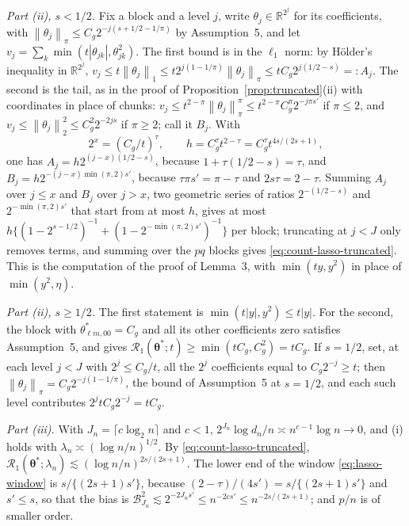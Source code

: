 \documentclass[10pt]{book}
\theoremstyle{definition}
\newcommand{\R}{\mathbb{R}}
\newcommand{\norm}[1]{\left\lVert #1 \right\rVert}
\newcommand{\cv}{\ell}
\newcommand{\md}{m}
\newcommand{\lev}{j}
\newcommand{\tsl}{k}
\newcommand{\btheta}{\boldsymbol{\theta}}
\newcommand{\thetastar}{\btheta^{*}}
\newcommand{\penn}{\lambda_{n}}
\newcommand{\seff}{s'}
\newcommand{\Rone}{\mathcal{R}_{1}}
\begin{document}
{\emph{Part (ii), $s < 1/2$.} Fix a block and a level $\lev$, write
$\theta_{\lev} \in \R^{2^{\lev}}$ for its coefficients, with
$\norm{\theta_{\lev}}_{\pi} \le C_g2^{-\lev(s+1/2-1/\pi)}$ by Assumption~5,
and let $v_{\lev} = \sum_{\tsl}\min(t|\theta_{\lev\tsl}|,\theta_{\lev\tsl}^{2})$.
The first bound is in the $\ell_1$ norm: by H\"older's inequality in
$\R^{2^{\lev}}$, $v_{\lev} \le t\norm{\theta_{\lev}}_{1} \le
t2^{\lev(1-1/\pi)}\norm{\theta_{\lev}}_{\pi} \le tC_g2^{\lev(1/2-s)} =:
A_{\lev}$. The second is the tail, as in the proof of
Proposition~\ref{prop:truncated}(ii) with coordinates in place of chunks:
$v_{\lev} \le t^{2-\pi}\norm{\theta_{\lev}}_{\pi}^{\pi} \le
t^{2-\pi}C_g^{\pi}2^{-\lev\pi\seff}$ if $\pi \le 2$, and
$v_{\lev} \le \norm{\theta_{\lev}}_{2}^{2} \le C_g^{2}2^{-2\lev s}$ if
$\pi \ge 2$; call it $B_{\lev}$. With
\[
  2^{x} = (C_g/t)^{\tau},
  \qquad
  h = C_g^{\tau}t^{2-\tau} = C_g^{\tau}t^{4s/(2s+1)},
\]
one has $A_{\lev} = h2^{(\lev-x)(1/2-s)}$, because $1 + \tau(1/2-s) = \tau$,
and $B_{\lev} = h2^{-(\lev-x)\min(\pi,2)\seff}$, because
$\tau\pi\seff = \pi-\tau$ and $2s\tau = 2-\tau$. Summing $A_{\lev}$ over
$\lev \le x$ and $B_{\lev}$ over $\lev > x$, two geometric series of ratios
$2^{-(1/2-s)}$ and $2^{-\min(\pi,2)\seff}$ that start from at most $h$, gives
at most $h\{(1-2^{s-1/2})^{-1} + (1-2^{-\min(\pi,2)\seff})^{-1}\}$ per block;
truncating at $\lev < J$ only removes terms, and summing over the $pq$
blocks gives \eqref{eq:count-lasso-truncated}. This is the computation of
the proof of Lemma~3, with $\min(ty,y^{2})$ in place of $\min(y^{2},\eta)$.

\emph{Part (ii), $s \ge 1/2$.} The first statement is
$\min(t|y|,y^{2}) \le t|y|$. For the second, the block with
$\theta^{*}_{\cv\md,00} = C_g$ and all its other coefficients zero satisfies
Assumption~5, and gives $\Rone(\thetastar;t) \ge \min(tC_g,C_g^{2}) = tC_g$.
If $s = 1/2$, set, at each level $\lev < J$ with $2^{\lev} \le C_g/t$, all
the $2^{\lev}$ coefficients equal to $C_g2^{-\lev} \ge t$; then
$\norm{\theta_{\lev}}_{\pi} = C_g2^{-\lev(1-1/\pi)}$, the bound of
Assumption~5 at $s = 1/2$, and each such level contributes
$2^{\lev}tC_g2^{-\lev} = tC_g$.

\emph{Part (iii).} With $J_n = \lceil c\log_2 n\rceil$ and $c < 1$,
$2^{J_n}\log d_n/n \asymp n^{c-1}\log n \to 0$, and (i) holds with
$\penn \asymp (\log n/n)^{1/2}$. By \eqref{eq:count-lasso-truncated},
$\Rone(\thetastar;\penn) \lesssim (\log n/n)^{2s/(2s+1)}$. The lower end of
the window \eqref{eq:lasso-window} is $s/\{(2s+1)\seff\}$, because
$(2-\tau)/(4\seff) = s/\{(2s+1)\seff\}$ and $\seff \le s$, so that the bias
is $\mathcal{B}_{J_n}^{2} \lesssim 2^{-2J_n\seff} \le n^{-2c\seff} \le
n^{-2s/(2s+1)}$; and $p/n$ is of smaller order.

}
\end{document}
